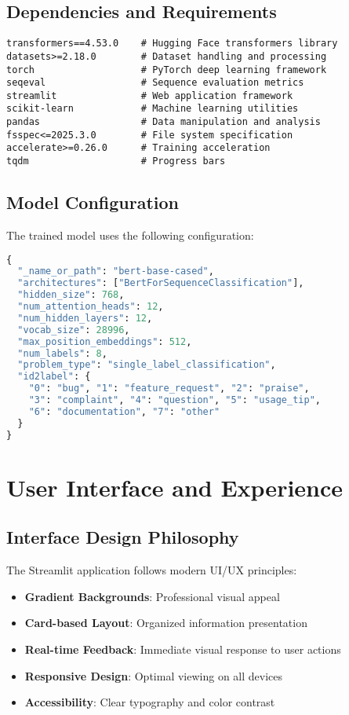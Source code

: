 \documentclass[11pt,a4paper]{article}
\begin{document}
\subsection{Dependencies and Requirements}
\begin{lstlisting}[style=code]
transformers==4.53.0    # Hugging Face transformers library
datasets>=2.18.0        # Dataset handling and processing
torch                   # PyTorch deep learning framework
seqeval                 # Sequence evaluation metrics
streamlit               # Web application framework
scikit-learn            # Machine learning utilities
pandas                  # Data manipulation and analysis
fsspec<=2025.3.0        # File system specification
accelerate>=0.26.0      # Training acceleration
tqdm                    # Progress bars
\end{lstlisting}

\subsection{Model Configuration}
The trained model uses the following configuration:
\begin{lstlisting}[style=code,language=Python]
{
  "_name_or_path": "bert-base-cased",
  "architectures": ["BertForSequenceClassification"],
  "hidden_size": 768,
  "num_attention_heads": 12,
  "num_hidden_layers": 12,
  "vocab_size": 28996,
  "max_position_embeddings": 512,
  "num_labels": 8,
  "problem_type": "single_label_classification",
  "id2label": {
    "0": "bug", "1": "feature_request", "2": "praise", 
    "3": "complaint", "4": "question", "5": "usage_tip", 
    "6": "documentation", "7": "other"
  }
}
\end{lstlisting}

\section{User Interface and Experience}

\subsection{Interface Design Philosophy}
The Streamlit application follows modern UI/UX principles:
\begin{itemize}
  \item \textbf{Gradient Backgrounds}: Professional visual appeal
  \item \textbf{Card-based Layout}: Organized information presentation
  \item \textbf{Real-time Feedback}: Immediate visual response to user actions
  \item \textbf{Responsive Design}: Optimal viewing on all devices
  \item \textbf{Accessibility}: Clear typography and color contrast
\end{itemize}
\end{document}
